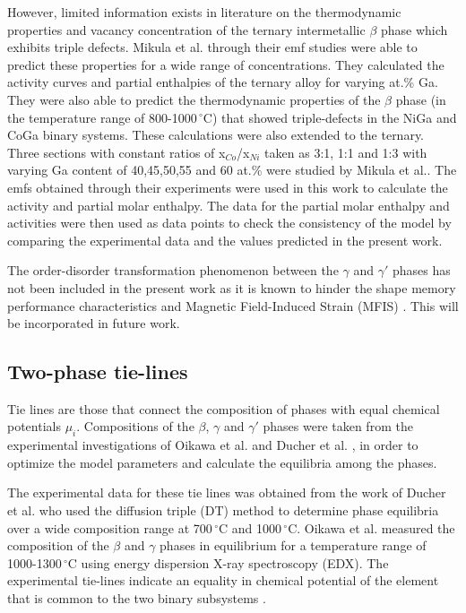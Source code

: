 \documentclass[article]{elsarticle}
\begin{document}
However, limited information exists in literature on the thermodynamic properties and
vacancy concentration of the ternary intermetallic $\beta$ phase which exhibits triple defects.
Mikula et al.\cite{Mik87} through their emf studies were able to predict these properties for
a wide range of concentrations. They calculated the activity curves and partial enthalpies
of the ternary alloy for varying at.\% Ga. They were also able to predict the thermodynamic properties
of the $\beta$ phase (in the temperature range of 800-1000$\,^{\circ}\mathrm{C}$)
that showed triple-defects in the NiGa and CoGa binary systems. These calculations
were also extended to the ternary. Three sections with constant ratios of x$_{Co}$/x$_{Ni}$
taken as 3:1, 1:1 and 1:3 with varying
Ga content of 40,45,50,55 and 60 at.\% were studied by Mikula et al.\cite{Mik87}. The emfs
obtained through their experiments were used in this work to calculate the activity and partial molar enthalpy.
The data for the partial molar enthalpy and activities were then used
as data points to check the consistency of the model by comparing the experimental data and the values
predicted in the present work.

The order-disorder transformation phenomenon between the $\gamma$ and $\gamma'$ phases has not been included
in the present work as it is known to hinder the shape memory performance characteristics \cite{Omo04,Tan04,Liu06}
and Magnetic Field-Induced Strain (MFIS) \cite{Liu05,Liu06}. This will be incorporated in future work.

\subsection{Two-phase tie-lines}
Tie lines are those that connect the composition of phases with equal chemical potentials $\mu_{i}$. 
Compositions of the $\beta$, $\gamma$ and $\gamma'$ phases were taken from the experimental
investigations of Oikawa et al. and Ducher et al. \cite{Oik06,Duch08,Oik01}, in order to
optimize the model parameters and calculate the equilibria among the phases.

The experimental data for these tie lines was obtained from the work
of Ducher et al. \cite{Duch08} who used the diffusion triple (DT) method to determine phase
equilibria over a wide composition range at 700$\,^{\circ}\mathrm{C}$ and 1000$\,^{\circ}\mathrm{C}$.
Oikawa et al. \cite{Oik01} measured the composition of the $\beta$ and $\gamma$ phases
in equilibrium for a temperature range of 1000-1300$\,^{\circ}\mathrm{C}$ using energy
dispersion X-ray spectroscopy (EDX). The experimental tie-lines indicate an equality in chemical potential of the element
that is common to the two binary subsystems \cite{Hans07}.
\end{document}
